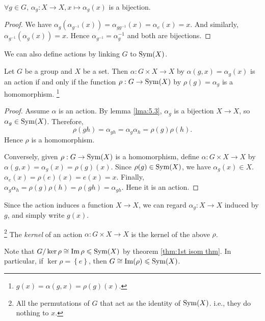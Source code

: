\documentclass[a4paper]{article}
\begin{document}
        \begin{lemma}\label{lma:5.3}
            $ \forall g\in G $, $ \alpha_g:X\to X, x \mapsto \alpha_g(x) $ is a bijection.
        \end{lemma}
        \begin{proof}
            We have $ \alpha_g(\alpha_{g^{-1}}(x))=\alpha_{gg^{-1}}(x)=\alpha_e(x)=x $. And similarly, $ \alpha_{g^{-1}}(\alpha_g(x))=x $. Hence $ \alpha_{g^{-1}}=\alpha_g^{-1} $ and both are bijections.
        \end{proof}
        We can also define actions by linking $G$ to $ \operatorname{Sym}(X) $.
        \begin{proposition}\label{prop:5.4}
            Let $G$ be a group and $X$ be a set. Then $ \alpha:G \times X \to X $ by $ \alpha(g,x)=\alpha_g(x) $ is an action if and only if the function $ \rho:G \to \operatorname{Sym}(X) $ by $ \rho(g)=\alpha_g $ is a homomorphism.
            \footnote{$ g(x)=\alpha(g,x)=\rho(g)(x) $.}
        \end{proposition}
        
        \begin{proof}
            Assume $ \alpha $ is an action. By lemma \ref{lma:5.3}, $ \alpha_g $ is a bijection $ X \to X $, so $ \alpha_g\in \operatorname{Sym}(X) $. Therefore,
            \[
                \rho(gh)=\alpha_{gh}=\alpha_g \alpha_h=\rho(g)\rho(h)
            .\]
            Hence $ \rho $ is a homomorphism.

            Conversely, given $ \rho:G \to \operatorname{Sym}(X) $ is a homomorphism, define $ \alpha:G \times X \to X $ by $ \alpha(g,x)=\alpha_g(x)=\rho(g)(x) $. Since $ \rho(g)\in \operatorname{Sym}(X) $, we have $ \alpha_g(x)\in X $. $ \alpha_e(x)=\rho(e)(x)=e(x)=x $. Finally, $ \alpha_g \alpha_h=\rho(g)\rho(h)=\rho(gh)=\alpha_{gh}$. Hene it is an action.
        \end{proof}
        \begin{remark}
            Since the action induces a function $ X \to X $, we can regard $ \alpha_g:X \to X $ induced by $g$, and simply write $ g(x) $.  
        \end{remark}
        \begin{definition}
            \footnote{All the permutations of $G$ that act as the identity of $ \operatorname{Sym}(X) $. i.e., they do nothing to $x$.}
            The \textit{kernel} of an action $ \alpha:G \times X \to X $ is the kernel of the above $ \rho $.
        \end{definition}
        Note that $ G/\ker \rho \cong \operatorname{Im} \rho\leqslant \operatorname{Sym}(X) $ by theorem \ref{thm:1st isom thm}. In particular, if $ \ker \rho = \left\{ e\right\} $, then $ G \cong \operatorname{Im}(\rho)\leqslant \operatorname{Sym}(X) $.
\end{document}
